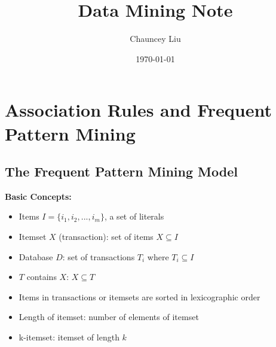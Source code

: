 \documentclass{article}
\title{\huge{\textbf{Data Mining Note}}}
\author{Chauncey Liu}
\date{\today}
\begin{document}
 
\maketitle
 
\tableofcontents

\newpage
 
\section{Association Rules and Frequent Pattern Mining}
\subsection{The Frequent Pattern Mining Model}
\textbf{Basic Concepts:}
\begin{itemize}
\item Items $I = \{i_1, i_2, ..., i_m\}$, a set of literals 
\item Itemset $X$ (transaction): set of items $X \subseteq I$
\item Database $D$: set of transactions $T_i$ where $T_i \subseteq I$
\item $T$ contains $X$: $X \subseteq T$
\item Items in transactions or itemsets are sorted in lexicographic order
\item Length of itemset: number of elements of itemset
\item k-itemset: itemset of length $k$
\end{itemize}
\end{document}
